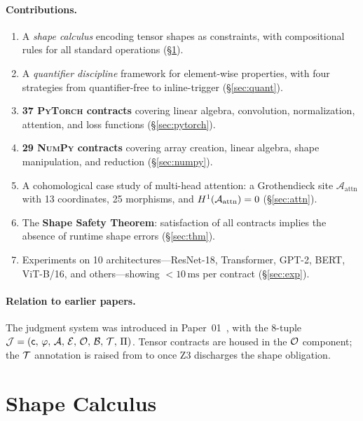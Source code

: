\documentclass[11pt]{article}
\newcommand{\AttnSite}{\mathcal{A}_{\mathrm{attn}}}%
\newcommand{\PyTorch}{\textsc{PyTorch}\xspace}
\newcommand{\NumPy}{\textsc{NumPy}\xspace}
\begin{document}
\paragraph{Contributions.}
\begin{enumerate}[leftmargin=*,label=(\alph*)]
\item A \emph{shape calculus} encoding tensor shapes as
      \QFLIA{} constraints, with compositional rules for all standard
      operations (\S\ref{sec:shape}).
\item A \emph{quantifier discipline} framework for element-wise
      properties, with four strategies from quantifier-free to
      inline-trigger (\S\ref{sec:quant}).
\item \textbf{37 \PyTorch contracts} covering linear algebra,
      convolution, normalization, attention, and loss
      functions (\S\ref{sec:pytorch}).
\item \textbf{29 \NumPy contracts} covering array creation, linear
      algebra, shape manipulation, and reduction (\S\ref{sec:numpy}).
\item A cohomological case study of multi-head attention: a
      Grothendieck site $\AttnSite$ with 13 coordinates,
      25 morphisms, and $\Hcoh{1}(\AttnSite) = 0$ (\S\ref{sec:attn}).
\item The \textbf{Shape Safety Theorem}: satisfaction of all contracts
      implies the absence of runtime shape errors (\S\ref{sec:thm}).
\item Experiments on 10 architectures---ResNet-18, Transformer,
      GPT-2, BERT, ViT-B/16, and others---showing $<\!10\,\text{ms}$
      per contract (\S\ref{sec:exp}).
\end{enumerate}

\paragraph{Relation to earlier papers.}
The \JuGeo{} judgment system was introduced in Paper~01~\cite{jg01},
with the 8-tuple $\mathcal{J} = (\mathsf{c},\,\varphi,\,\mathcal{A},\,\mathcal{E},\,\mathcal{O},\,\mathcal{B},\,\mathcal{T},\,\Pi)$.  Tensor contracts are housed in the
$\mathcal{O}$ component; the $\mathcal{T}$ annotation is raised from \Tcopilot{}
to \Tsolver{} once Z3 discharges the shape obligation.

\section{Shape Calculus}
\label{sec:shape}
\end{document}
